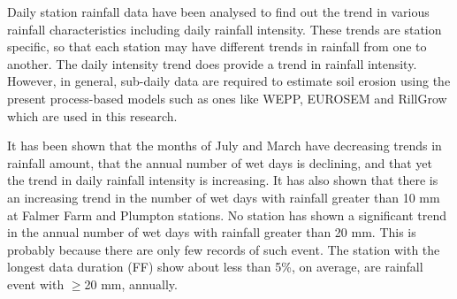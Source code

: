 Daily station rainfall data have been analysed to find out the trend in various
rainfall characteristics including daily rainfall intensity. These trends are
station specific, so that each station may have different trends in rainfall
from one to another. The daily intensity trend does provide a trend in rainfall
intensity. However, in general, sub-daily data are required to estimate soil
erosion using the present process-based models such as ones like WEPP, EUROSEM
and RillGrow which are used in this research.

It has been shown that the months of July and March have decreasing trends in
rainfall amount, that the annual number of wet days is declining, and that yet
the trend in daily rainfall intensity is increasing. It has also shown that
there is an increasing trend in the number of wet days with rainfall greater
than 10 mm at Falmer Farm and Plumpton stations. No station has shown a
significant trend in the annual number of wet days with rainfall greater than 20
mm. This is probably because there are only few records of such event. The
station with the longest data duration (FF) show about less than 5\%, on
average, are rainfall event with $\geq$20 mm, annually.





